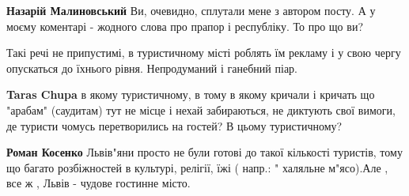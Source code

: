 \begin{itemize}
\begin{itemize}
\begin{itemize}
 
\textbf{Назарій Малиновський} Ви, очевидно, сплутали мене з автором посту. А у
моєму коментарі - жодного слова про прапор і республіку. То про що ви?
\end{itemize}

\end{itemize}

 

Такі речі не припустимі, в туристичному місті роблять їм рекламу і у свою чергу
опускаться до їхнього рівня. Непродуманий і ганебний піар.

\begin{itemize}
 
\textbf{Taras Chupa} в якому туристичному, в тому в якому кричали і кричать що
"арабам" (саудитам) тут не місце і нехай забираються, не диктують свої вимоги,
де туристи чомусь перетворились на гостей? В цьому туристичному?

\begin{itemize}
 
\textbf{Роман Косенко} Львів"яни просто не були готові до такої кількості
туристів, тому що багато розбіжностей в культурі, релігії, їжі ( напр.: "
халяльне м"ясо).Але , все ж , Львів - чудове гостинне місто.

 

\end{itemize}
\end{itemize}
\end{itemize}
